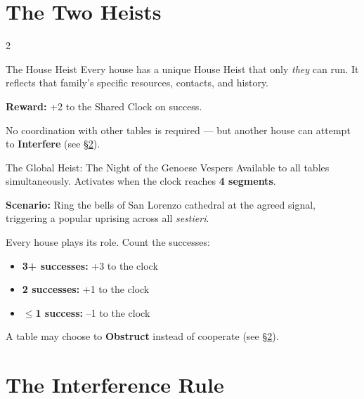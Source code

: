 \section{The Two Heists}
\label{sec:heists}

\begin{multicols}{2}

\begin{rulebox}[GoldRPG]{The House Heist}
Every house has a unique House Heist that only \textit{they} can run.
It reflects that family's specific resources, contacts, and history.

\medskip
\textbf{Reward:} +2 to the Shared Clock on success.

\medskip
No coordination with other tables is required --- but another house
can attempt to \textbf{Interfere} (see \S\ref{sec:interference}).
\end{rulebox}

\columnbreak

\begin{rulebox}[GoldRPG]{The Global Heist: The Night of the Genoese Vespers}
Available to all tables simultaneously. Activates when the clock
reaches \textbf{4 segments}.

\medskip
\textbf{Scenario:} Ring the bells of San Lorenzo cathedral at the
agreed signal, triggering a popular uprising across all \textit{sestieri}.

\medskip
Every house plays its role. Count the successes:
\begin{itemize}
  \item \textbf{3+ successes:} +3 to the clock
  \item \textbf{2 successes:} +1 to the clock
  \item \textbf{$\leq$1 success:} --1 to the clock
\end{itemize}

A table may choose to \textbf{Obstruct} instead of cooperate
(see \S\ref{sec:interference}).
\end{rulebox}

\end{multicols}

\section{The Interference Rule}
\label{sec:interference}

